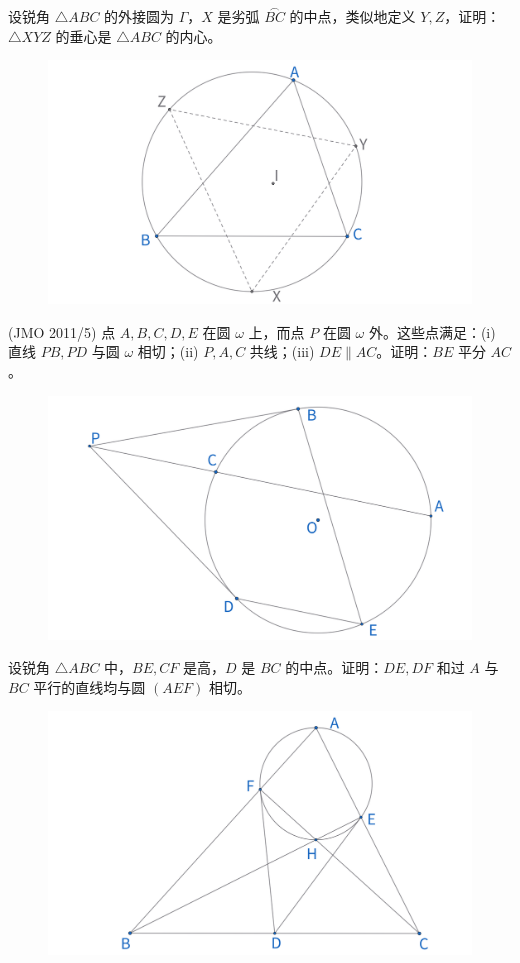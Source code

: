 \newpage 
\begin{exercise}
设锐角 $\triangle ABC$ 的外接圆为 $\Gamma$，$X$ 是劣弧 $\overset{\frown}{BC}$ 的中点，类似地定义 $Y, Z$，证明：$\triangle XYZ$ 的垂心是 $\triangle ABC$ 的内心。
\end{exercise}
\begin{figure}[H]
    \centering
    \includegraphics[width=0.7\linewidth]{figures/exercises/007.png}
\end{figure}


\begin{exercise}
(JMO 2011/5) 点 $A, B, C, D, E$ 在圆 $\omega$ 上，而点 $P$ 在圆 $\omega$ 外。这些点满足：(i) 直线 $PB, PD$ 与圆 $\omega$ 相切；(ii) $P, A, C$ 共线；(iii) $DE \parallel AC$。证明：$BE$ 平分 ${AC}$。
\end{exercise}
\begin{figure}[H]
    \centering
    \includegraphics[width=0.7\linewidth]{figures/exercises/008.png}
\end{figure}

\newpage 
\begin{exercise}
设锐角 $\triangle ABC$ 中，$BE, CF$ 是高，$D$ 是 ${BC}$ 的中点。证明：$DE, DF$ 和过 $A$ 与 ${BC}$ 平行的直线均与圆 $(AEF)$ 相切。
\end{exercise}
\begin{figure}[H]
    \centering
    \includegraphics[width=0.7\linewidth]{figures/exercises/009.png}
\end{figure}


